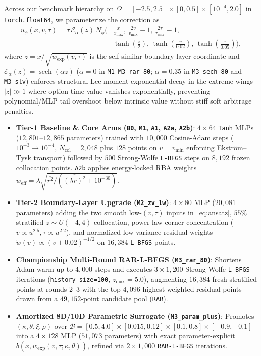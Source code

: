 \documentclass[preprint,12pt]{elsarticle}
\begin{document}
Across our benchmark hierarchy on $\Omega = [-2.5, 2.5] \times [0, 0.5] \times [10^{-4}, 2.0]$ in \texttt{torch.float64}, we parameterize the correction as
\begin{equation}
\begin{split}
  u_\phi(x, v, \tau) = \tau\,\mathcal{E}_\alpha(z)\,N_\phi\!\Big(&\frac{x}{x_{\max}},\, \frac{2v}{v_{\max}} - 1,\, \frac{2\tau}{\tau_{\max}} - 1,\\
  &\tanh\!\left(\frac{z}{2}\right),\, \tanh\!\left(\frac{v}{0.02}\right),\, \tanh\!\left(\frac{\tau}{0.05}\right)\!\Big),
\end{split}
  \label{eq:ansatz}
\end{equation}
where $z = x/\sqrt{w_{\mathrm{exp}}(v,\tau)}$ is the self-similar boundary-layer coordinate and $\mathcal{E}_\alpha(z) = \operatorname{sech}(\alpha z)$ ($\alpha = 0$ in \texttt{M1}--\texttt{M3\_rar\_80}; $\alpha = 0.35$ in \texttt{M3\_sech\_80} and \texttt{M3\_slv}) enforces structural Lee-moment exponential decay \cite{lee2004moment} in the extreme wings $|z| \gg 1$ where option time value vanishes exponentially, preventing polynomial/MLP tail overshoot below intrinsic value without stiff soft arbitrage penalties.

\begin{itemize}
  \item \textbf{Tier-1 Baseline \& Core Arms (\texttt{B0}, \texttt{M1}, \texttt{A1}, \texttt{A2a}, \texttt{A2b})}: $4\times 64$ \texttt{Tanh} MLPs ($12{,}801\text{--}12{,}865$ parameters) trained with $10{,}000$ Cosine-Adam steps ($10^{-3}\to 10^{-4}$, $N_{\mathrm{col}} = 2{,}048$ plus $128$ points on $v = v_{\min}$ enforcing Ekstr\"om--Tysk transport) followed by $500$ Strong-Wolfe \texttt{L-BFGS} steps on $8{,}192$ frozen collocation points. \texttt{A2b} applies energy-locked RBA weights $w_{\mathrm{eff}} = \lambda\sqrt{\overline{r^2}/(\overline{(\lambda r)^2} + 10^{-30})}$.
  \item \textbf{Tier-2 Boundary-Layer Upgrade (\texttt{M2\_zv\_lw})}: $4\times 80$ MLP ($20{,}081$ parameters) adding the two smooth low-$(v,\tau)$ inputs in~\eqref{eq:ansatz}, $55\%$ stratified $z \sim U(-4, 4)$ collocation, power-law corner concentration ($v \propto u^{2.5}, \tau \propto u^{2.2}$), and normalized low-variance residual weights $\tilde{w}(v) \propto (v + 0.02)^{-1/2}$ on $16{,}384$ \texttt{L-BFGS} points.
  \item \textbf{Championship Multi-Round RAR-L-BFGS (\texttt{M3\_rar\_80})}: Shortens Adam warm-up to $4{,}000$ steps and executes $3 \times 1{,}200$ Strong-Wolfe \texttt{L-BFGS} iterations (\texttt{history\_size=100}, $z_{\max} = 5.0$), augmenting $16{,}384$ fresh stratified points at rounds 2--3 with the top $4{,}096$ highest weighted-residual points drawn from a $49{,}152$-point candidate pool (\texttt{RAR}).
  \item \textbf{Amortized 8D/10D Parametric Surrogate (\texttt{M3\_param\_plus})}: Promotes $(\kappa, \theta, \xi, \rho)$ over $\mathcal{B} = [0.5, 4.0]\times[0.015, 0.12]\times[0.1, 0.8]\times[-0.9, -0.1]$ into a $4\times 128$ MLP ($51{,}073$ parameters) with exact parameter-explicit $b(x, w_{\mathrm{exp}}(v,\tau;\kappa,\theta))$, refined via $2 \times 1{,}000$ \texttt{RAR-L-BFGS} iterations.
\end{itemize}
\end{document}
